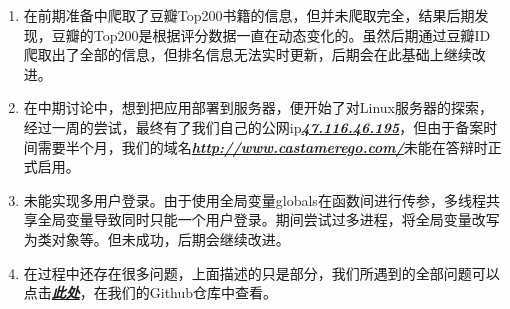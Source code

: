 \documentclass[twoside,11pt]{article}
\begin{document}
\begin{enumerate}
    \item 在前期准备中爬取了豆瓣Top200书籍的信息，但并未爬取完全，结果后期发现，豆瓣的Top200是根据评分数据一直在动态变化的。虽然后期通过豆瓣ID爬取出了全部的信息，但排名信息无法实时更新，后期会在此基础上继续改进。
    \item 在中期讨论中，想到把应用部署到服务器，便开始了对Linux服务器的探索，经过一周的尝试，最终有了我们自己的公网ip\href{http://47.116.46.195/}{\textbf{\emph{47.116.46.195}}}，但由于备案时间需要半个月，我们的域名\href{http://www.castamerego.com/}{\textbf{\emph{http://www.castamerego.com/}}}未能在答辩时正式启用。
    \item 未能实现多用户登录。由于使用全局变量globals在函数间进行传参，多线程共享全局变量导致同时只能一个用户登录。期间尝试过多进程，将全局变量改写为类对象等。但未成功，后期会继续改进。
    \item 在过程中还存在很多问题，上面描述的只是部分，我们所遇到的全部问题可以点击\href{https://github.com/Casta-mere/Read-Book/tree/main/record/bugs}{\textbf{\emph{此处}}}，在我们的Github仓库中查看。
\end{enumerate}


\end{document}
